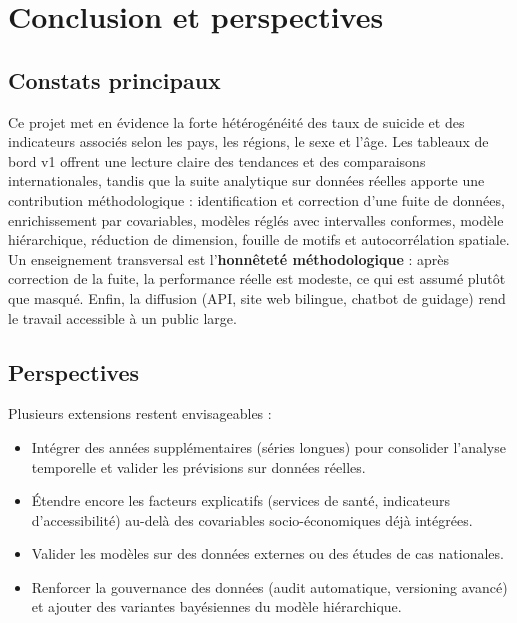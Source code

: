 \chapter{Conclusion et perspectives}
\section{Constats principaux}
Ce projet met en évidence la forte hétérogénéité des taux de suicide et des indicateurs associés selon les pays, les régions, le sexe et l'âge. Les tableaux de bord v1 offrent une lecture claire des tendances et des comparaisons internationales, tandis que la suite analytique sur données réelles apporte une contribution méthodologique : identification et correction d'une fuite de données, enrichissement par covariables, modèles réglés avec intervalles conformes, modèle hiérarchique, réduction de dimension, fouille de motifs et autocorrélation spatiale. Un enseignement transversal est l'\textbf{honnêteté méthodologique} : après correction de la fuite, la performance réelle est modeste, ce qui est assumé plutôt que masqué. Enfin, la diffusion (API, site web bilingue, chatbot de guidage) rend le travail accessible à un public large.

\section{Perspectives}
Plusieurs extensions restent envisageables :
\begin{itemize}
    \item Intégrer des années supplémentaires (séries longues) pour consolider l'analyse temporelle et valider les prévisions sur données réelles.
    \item Étendre encore les facteurs explicatifs (services de santé, indicateurs d'accessibilité) au-delà des covariables socio-économiques déjà intégrées.
    \item Valider les modèles sur des données externes ou des études de cas nationales.
    \item Renforcer la gouvernance des données (audit automatique, versioning avancé) et ajouter des variantes bayésiennes du modèle hiérarchique.
\end{itemize}
